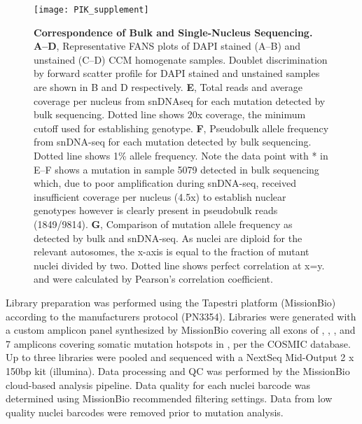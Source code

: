 \begin{figure}[tbp!]
\begin{center}
\texttt{[image: PIK\_supplement]}
\end{center}
\caption[Correspondence of Bulk and Single-Nucleus Sequencing] {\textbf{Correspondence of Bulk and Single-Nucleus Sequencing.} \\ \textbf{A--D}, Representative FANS plots of DAPI stained (A--B) and unstained (C--D) CCM homogenate samples. Doublet discrimination by forward scatter profile for DAPI stained and unstained samples are shown in B and D respectively. \textbf{E}, Total reads and average coverage per nucleus from snDNAseq for each mutation detected by bulk sequencing. Dotted line shows 20x coverage, the minimum cutoff used for establishing genotype. \textbf{F}, Pseudobulk allele frequency from snDNA-seq for each mutation detected by bulk sequencing. Dotted line shows 1\% allele frequency. Note the data point with * in E--F shows a mutation in sample 5079 detected in bulk sequencing which, due to poor amplification during snDNA-seq, received insufficient coverage per nucleus (4.5x) to establish nuclear genotypes however is clearly present in pseudobulk reads (1849/9814). \textbf{G}, Comparison of mutation allele frequency as detected by bulk and snDNA-seq. As nuclei are diploid for the relevant autosomes, the x-axis is equal to the fraction of mutant nuclei divided by two. Dotted line shows perfect correlation at x=y.  and  were calculated by Pearson’s correlation coefficient. }

\label{PIK_supplement}
\end{figure}

Library preparation was performed using the Tapestri platform (MissionBio) according to the manufacturers protocol (PN3354). Libraries were generated with a custom amplicon panel synthesized by MissionBio covering all exons of , , , and 7 amplicons covering somatic mutation hotspots in , per the COSMIC database. Up to three libraries were pooled and sequenced with a NextSeq Mid-Output 2 x 150bp kit (illumina). Data processing and QC was performed by the MissionBio cloud-based analysis pipeline. Data quality for each nuclei barcode was determined using MissionBio recommended filtering settings. Data from low quality nuclei barcodes were removed prior to mutation analysis. 
	
